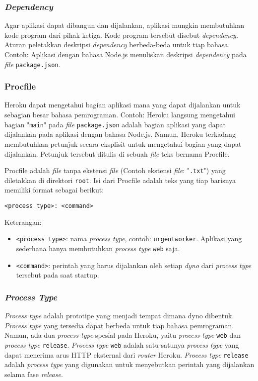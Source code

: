 \subsubsection{\textit{Dependency}}
Agar aplikasi dapat dibangun dan dijalankan, aplikasi mungkin membutuhkan kode program dari pihak ketiga. Kode program tersebut disebut \textit{dependency}. Aturan peletakkan deskripsi \textit{dependency} berbeda-beda untuk tiap bahasa. Contoh: Aplikasi dengan bahasa Node.js menuliskan deskripsi \textit{dependency} pada \textit{file} \texttt{package.json}.

\subsubsection{Procfile}
Heroku dapat mengetahui bagian aplikasi mana yang dapat dijalankan untuk sebagian besar bahasa pemrograman. Contoh: Heroku langsung mengetahui bagian "\texttt{main}" pada \textit{file} \texttt{package.json} adalah bagian aplikasi yang dapat dijalankan pada aplikasi dengan bahasa Node.js. Namun, Heroku terkadang membutuhkan petunjuk secara eksplisit untuk mengetahui bagian yang dapat dijalankan. Petunjuk tersebut ditulis di sebuah \textit{file} teks bernama Procfile. 

Procfile adalah \textit{file} tanpa ekstensi \textit{file} (Contoh ekstensi \textit{file}: "\texttt{.txt}") yang diletakkan di direktori \texttt{root}. Isi dari Procfile adalah teks yang tiap barisnya memiliki format sebagai berikut:
\begin{lstlisting}
<process type>: <command>
\end{lstlisting}
Keterangan:
\begin{itemize}
\item \texttt{<process type>}: nama \textit{process type}, contoh: \texttt{urgentworker}. Aplikasi yang sederhana hanya membutuhkan \textit{process type} \texttt{web} saja.
\item \texttt{<command>}: perintah yang harus dijalankan oleh setiap \textit{dyno} dari \textit{process type} tersebut pada saat startup.
\end{itemize}

\subsubsection{\textit{Process Type}}
\textit{Process type} adalah prototipe yang menjadi tempat dimana dyno dibentuk. \textit{Process type} yang tersedia dapat berbeda untuk tiap bahasa pemrograman. Namun, ada dua \textit{process type} spesial pada Heroku, yaitu \textit{process type} \texttt{web} dan \textit{process type} \texttt{release}. \textit{Process type} \texttt{web} adalah satu-satunya \textit{process type} yang dapat menerima arus HTTP eksternal dari \textit{router} Heroku. \textit{Process type} \texttt{release} adalah \textit{process type} yang digunakan untuk menyebutkan perintah yang dijalankan selama fase \textit{release}.

